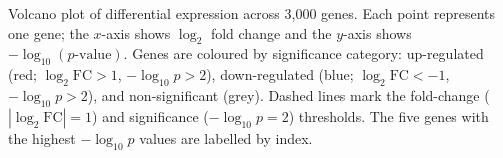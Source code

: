 \caption{Volcano plot of differential expression across 3{,}000 genes. Each point represents one gene; the $x$-axis shows $\log_2$ fold change and the $y$-axis shows $-\log_{10}(p\text{-value})$. Genes are coloured by significance category: up-regulated (red; $\log_2\text{FC} > 1$, $-\log_{10}p > 2$), down-regulated (blue; $\log_2\text{FC} < -1$, $-\log_{10}p > 2$), and non-significant (grey). Dashed lines mark the fold-change ($|\log_2\text{FC}| = 1$) and significance ($-\log_{10}p = 2$) thresholds. The five genes with the highest $-\log_{10}p$ values are labelled by index.}
